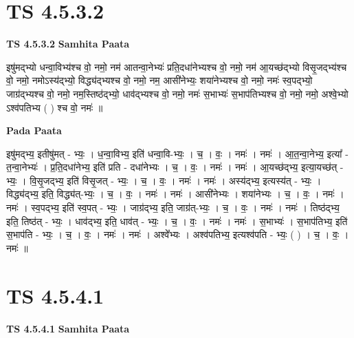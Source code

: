 \documentclass[17pt]{extarticle}
\begin{document}
\section*{ TS 4.5.3.2 }

\textbf{TS 4.5.3.2 } \newline
\textbf{Samhita Paata} \newline

इषु॑मद्भ्यो धन्वा॒विभ्य॑श्च वो॒ नमो॒                  नम॑ आतन्वा॒नेभ्यः॑ प्रति॒दधा॑नेभ्यश्च वो॒ नमो॒                                     नम॑ आ॒यच्छ॑द्भ्यो विसृ॒जद्भ्य॑श्च वो॒ नमो॒   नमोऽस्य॑द्भ्यो॒ विद्ध्य॑द्भ्यश्च वो॒ नमो॒                नम॒ आसी॑नेभ्यः॒ शया॑नेभ्यश्च वो॒ नमो॒                                               नमः॑ स्व॒पद्भ्यो॒ जाग्र॑द्भ्यश्च वो॒ नमो॒                                              नम॒स्तिष्ठ॑द्भ्यो॒ धाव॑द्भ्यश्च वो॒ नमो॒     नमः॑ स॒भाभ्यः॑ स॒भाप॑तिभ्यश्च वो॒ नमो॒                                            नमो॒ अश्वे॒भ्यो ऽश्व॑पतिभ्य ( ) श्च वो॒ नमः॑ ॥ \newline

\textbf{Pada Paata} \newline

इषु॑मद्भ्य॒ इतीषु॑मत् - भ्यः॒ । ध॒न्वा॒विभ्य॒ इति॑ धन्वा॒वि-भ्यः॒ । च॒ । वः॒ । नमः॑ । नमः॑ । आ॒त॒न्वा॒नेभ्य॒ इत्या᳚ - त॒न्वा॒नेभ्यः॑ । प्र॒ति॒दधा॑नेभ्य॒ इति॑ प्रति - दधा॑नेभ्यः । च॒ । वः॒ । नमः॑ । नमः॑ । आ॒यच्छ॑द्भ्य॒ इत्या॒यच्छ॑त् - भ्यः॒ । वि॒सृ॒जद्भ्य॒ इति॑ विसृ॒जत् - भ्यः॒ । च॒ । वः॒ । नमः॑ । नमः॑ । अस्य॑द्भ्य॒ इत्यस्य॑त् - भ्यः॒ । विद्ध्य॑द्भ्य॒ इति॒ विद्ध्य॑त्-भ्यः॒ । च॒ । वः॒ । नमः॑ । नमः॑ । आसी॑नेभ्यः । शया॑नेभ्यः । च॒ । वः॒ । नमः॑ । नमः॑ । स्व॒पद्भ्य॒ इति॑ स्व॒पत् - भ्यः॒ । जाग्र॑द्भ्य॒ इति॒ जाग्र॑त्-भ्यः॒ । च॒ । वः॒ । नमः॑ । नमः॑ । तिष्ठ॑द्भ्य॒ इति॒ तिष्ठ॑त् - भ्यः॒ । धाव॑द्भ्य॒ इति॒ धाव॑त् - भ्यः॒ । च॒ । वः॒ । नमः॑ । नमः॑ । स॒भाभ्यः॑ । स॒भाप॑तिभ्य॒ इति॑ स॒भाप॑ति - भ्यः॒ । च॒ । वः॒ । नमः॑ । नमः॑ । अश्वे᳚भ्यः । अश्व॑पतिभ्य॒ इत्यश्व॑पति - भ्यः॒ ( ) । च॒ । वः॒ । नमः॑ ॥  \newline




\section*{ TS 4.5.4.1 }

\textbf{TS 4.5.4.1 } \newline
\textbf{Samhita Paata} \newline
\end{document}
